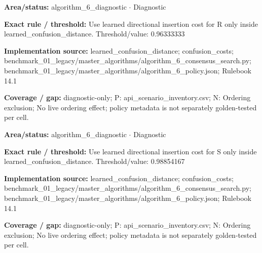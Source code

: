\begin{tcolorbox}[enhanced,breakable,colback=white,colframe=Muted!45,boxrule=0.45pt,arc=1.5pt,left=6pt,right=6pt,top=5pt,bottom=5pt,title={\texttt{A6-LEARNED-INSERTION-R}},title after break={\texttt{A6-LEARNED-INSERTION-R}\ (continued)},fonttitle=\headingfont\bfseries\color{Navy},coltitle=Navy]
\textbf{Area/status:} algorithm\_\allowbreak{}6\_\allowbreak{}diagnostic $\boldsymbol{\cdot}$ Diagnostic\par
\smallskip
\textbf{Exact rule / threshold:} Use learned directional insertion cost for R only inside learned\_\allowbreak{}confusion\_\allowbreak{}distance. Threshold/\allowbreak{}value: 0.96333333\par
\smallskip
\textbf{Implementation source:} learned\_\allowbreak{}confusion\_\allowbreak{}distance; confusion\_\allowbreak{}costs; benchmark\_\allowbreak{}01\_\allowbreak{}legacy/\allowbreak{}master\_\allowbreak{}algorithms/\allowbreak{}algorithm\_\allowbreak{}6\_\allowbreak{}consensus\_\allowbreak{}search.py; benchmark\_\allowbreak{}01\_\allowbreak{}legacy/\allowbreak{}master\_\allowbreak{}algorithms/\allowbreak{}algorithm\_\allowbreak{}6\_\allowbreak{}policy.json; Rulebook 14.1\par
\smallskip
\textbf{Coverage / gap:} diagnostic-only; P: api\_\allowbreak{}scenario\_\allowbreak{}inventory.csv; N: Ordering exclusion; No live ordering effect; policy metadata is not separately golden-tested per cell.
\end{tcolorbox}
\begin{tcolorbox}[enhanced,breakable,colback=white,colframe=Muted!45,boxrule=0.45pt,arc=1.5pt,left=6pt,right=6pt,top=5pt,bottom=5pt,title={\texttt{A6-LEARNED-INSERTION-S}},title after break={\texttt{A6-LEARNED-INSERTION-S}\ (continued)},fonttitle=\headingfont\bfseries\color{Navy},coltitle=Navy]
\textbf{Area/status:} algorithm\_\allowbreak{}6\_\allowbreak{}diagnostic $\boldsymbol{\cdot}$ Diagnostic\par
\smallskip
\textbf{Exact rule / threshold:} Use learned directional insertion cost for S only inside learned\_\allowbreak{}confusion\_\allowbreak{}distance. Threshold/\allowbreak{}value: 0.98854167\par
\smallskip
\textbf{Implementation source:} learned\_\allowbreak{}confusion\_\allowbreak{}distance; confusion\_\allowbreak{}costs; benchmark\_\allowbreak{}01\_\allowbreak{}legacy/\allowbreak{}master\_\allowbreak{}algorithms/\allowbreak{}algorithm\_\allowbreak{}6\_\allowbreak{}consensus\_\allowbreak{}search.py; benchmark\_\allowbreak{}01\_\allowbreak{}legacy/\allowbreak{}master\_\allowbreak{}algorithms/\allowbreak{}algorithm\_\allowbreak{}6\_\allowbreak{}policy.json; Rulebook 14.1\par
\smallskip
\textbf{Coverage / gap:} diagnostic-only; P: api\_\allowbreak{}scenario\_\allowbreak{}inventory.csv; N: Ordering exclusion; No live ordering effect; policy metadata is not separately golden-tested per cell.
\end{tcolorbox}
